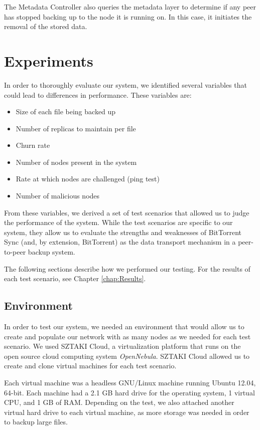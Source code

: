 \documentclass[12pt]{report}
\begin{document}
The Metadata Controller also queries the metadata layer to determine if any peer has stopped backing up to the node it is running on. In this case, it initiates the removal of the stored data.

\chapter{Experiments} \label{chap:Methodology}

In order to thoroughly evaluate our system, we identified several variables that could lead to differences in performance. These variables are:

\begin{itemize}
\item Size of each file being backed up
\item Number of replicas to maintain per file
\item Churn rate
\item Number of nodes present in the system
\item Rate at which nodes are challenged (ping test)
\item Number of malicious nodes
\end{itemize}

From these variables, we derived a set of test scenarios that allowed us to judge the performance of the system. While the test scenarios are specific to our system, they allow us to evaluate the strengths and weaknesses of BitTorrent Sync (and, by extension, BitTorrent) as the data transport mechanism in a peer-to-peer backup system.

The following sections describe how we performed our testing. For the results of each test scenario, see Chapter \ref{chap:Results}.

\section{Environment} \label{sec:Environment_chap:Methodology}

In order to test our system, we needed an environment that would allow us to create and populate our network with as many nodes as we needed for each test scenario. We used SZTAKI Cloud, a virtualization platform that runs on the open source cloud computing system \textit{OpenNebula}. SZTAKI Cloud allowed us to create and clone virtual machines for each test scenario.

Each virtual machine was a headless GNU/Linux machine running Ubuntu 12.04, 64-bit. Each machine had a 2.1 GB hard drive for the operating system, 1 virtual CPU, and 1 GB of RAM. Depending on the test, we also attached another virtual hard drive to each virtual machine, as more storage was needed in order to backup large files.
\end{document}
